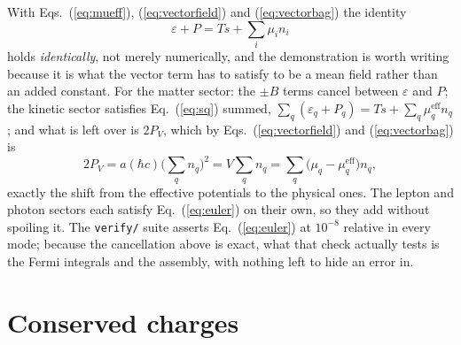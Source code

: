 \documentclass[aps,prc,onecolumn,superscriptaddress,nofootinbib,10pt]{revtex4-2}
\newcommand{\mueff}[1]{\mu^{\mathrm{eff}}_{#1}}
\begin{document}
With Eqs.~(\ref{eq:mueff}), (\ref{eq:vectorfield}) and (\ref{eq:vectorbag})
the identity
%
\begin{equation}
\varepsilon + P = T s + \sum_i \mu_i n_i
\label{eq:euler}
\end{equation}
%
holds \emph{identically}, not merely numerically, and the demonstration is
worth writing because it is what the vector term has to satisfy to be a mean
field rather than an added constant. For the matter sector: the $\pm B$ terms
cancel between $\varepsilon$ and $P$; the kinetic sector satisfies
Eq.~(\ref{eq:sq}) summed, $\sum_q (\varepsilon_q + P_q) = Ts + \sum_q
\mueff{q} n_q$; and what is left over is $2 P_V$, which by
Eqs.~(\ref{eq:vectorfield}) and (\ref{eq:vectorbag}) is
%
\begin{equation}
2 P_V = a (\hbar c) \Big( \sum_q n_q \Big)^{\!2} = V \sum_q n_q
      = \sum_q \big( \mu_q - \mueff{q} \big) n_q ,
\end{equation}
%
exactly the shift from the effective potentials to the physical ones. The
lepton and photon sectors each satisfy Eq.~(\ref{eq:euler}) on their own, so
they add without spoiling it. The \texttt{verify/} suite asserts
Eq.~(\ref{eq:euler}) at $10^{-8}$ relative in every mode; because the
cancellation above is exact, what that check actually tests is the Fermi
integrals and the assembly, with nothing left to hide an error in.

\section{Conserved charges}
\label{sec:charges}
\end{document}
